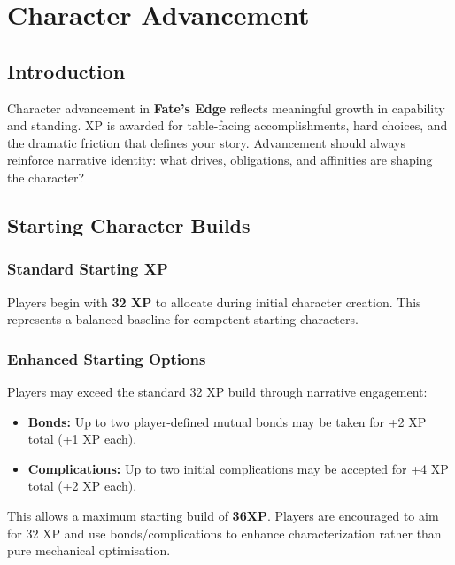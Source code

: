 
\chapter{Character Advancement}\label{chap:character_advancement}

\section{Introduction}\label{sec:advancement_intro}

Character advancement in \textbf{Fate's Edge} reflects meaningful growth in capability and standing. XP is awarded for table-facing accomplishments, hard choices, and the dramatic friction that defines your story. Advancement should always reinforce narrative identity: what drives, obligations, and affinities are shaping the character?

\section{Starting Character Builds}\label{sec:starting_builds}

\subsection{Standard Starting XP}\label{subsec:standard_starting}

Players begin with \textbf{32 XP} to allocate during initial character creation. This represents a balanced baseline for competent starting characters.

\subsection{Enhanced Starting Options}\label{subsec:enhanced_starting}

Players may exceed the standard 32 XP build through narrative engagement:
\begin{itemize}
    \item \textbf{Bonds:} Up to two player-defined mutual bonds may be taken for +2 XP total (+1 XP each).
    \item \textbf{Complications:} Up to two initial complications may be accepted for +4 XP total (+2 XP each).
\end{itemize}
This allows a maximum starting build of \textbf{36XP}. Players are encouraged to aim for 32 XP and use bonds/complications to enhance characterization rather than pure mechanical optimisation.

